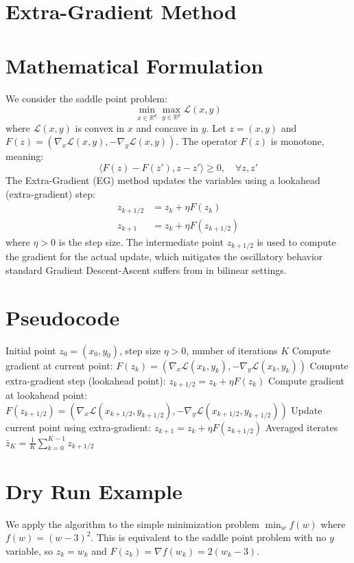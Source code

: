 \documentclass{article}
\begin{document}
\section*{Extra-Gradient Method}
\section*{Mathematical Formulation}
We consider the saddle point problem:
$$ \min_{x \in \mathbb{R}^d} \max_{y \in \mathbb{R}^p} \mathcal{L}(x, y) $$
where $\mathcal{L}(x, y)$ is convex in $x$ and concave in $y$. Let $z = (x, y)$ and $F(z) = (\nabla_x \mathcal{L}(x, y), -\nabla_y \mathcal{L}(x, y))$. The operator $F(z)$ is monotone, meaning:
$$ \langle F(z) - F(z'), z - z' \rangle \geq 0, \quad \forall z, z' $$
The Extra-Gradient (EG) method updates the variables using a lookahead (extra-gradient) step:
\begin{align*}
z_{k+1/2} &= z_k + \eta F(z_k) \\
z_{k+1} &= z_k + \eta F(z_{k+1/2})
\end{align*}
where $\eta > 0$ is the step size. The intermediate point $z_{k+1/2}$ is used to compute the gradient for the actual update, which mitigates the oscillatory behavior standard Gradient Descent-Ascent suffers from in bilinear settings.

\section*{Pseudocode}
\begin{algorithm}[H]
\caption{Extra-Gradient Method for Saddle Point Problems}
\begin{algorithmic}[1]
\REQUIRE Initial point $z_0 = (x_0, y_0)$, step size $\eta > 0$, number of iterations $K$
\STATE Compute gradient at current point: $F(z_k) = (\nabla_x \mathcal{L}(x_k, y_k), -\nabla_y \mathcal{L}(x_k, y_k))$
\STATE Compute extra-gradient step (lookahead point): $z_{k+1/2} = z_k + \eta F(z_k)$
\STATE Compute gradient at lookahead point: $F(z_{k+1/2}) = (\nabla_x \mathcal{L}(x_{k+1/2}, y_{k+1/2}), -\nabla_y \mathcal{L}(x_{k+1/2}, y_{k+1/2}))$
\STATE Update current point using extra-gradient: $z_{k+1} = z_k + \eta F(z_{k+1/2})$
\ENDFOR
\RETURN Averaged iterates $\bar{z}_K = \frac{1}{K} \sum_{k=0}^{K-1} z_{k+1/2}$
\end{algorithmic}
\end{algorithm}

\section*{Dry Run Example}
We apply the algorithm to the simple minimization problem $\min_w f(w)$ where $f(w) = (w-3)^2$. This is equivalent to the saddle point problem with no $y$ variable, so $z_k = w_k$ and $F(z_k) = \nabla f(w_k) = 2(w_k - 3)$.
\end{document}
